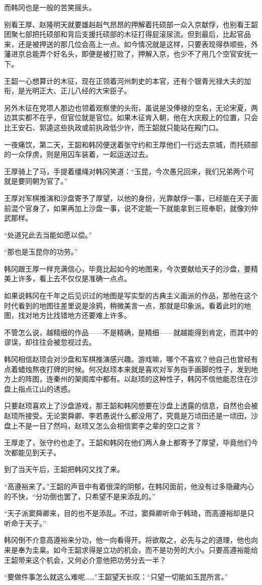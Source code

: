 而韩冈也是一般的苦笑摇头。

别看王厚、赵隆明天就要雄赳赳气昂昂的押解着托硕部一众入京献俘，也别看王韶团聚七部把托硕部和背后支援托硕部的木征打得屁滚尿流。但到最后，比起官品来，还是被押送的那几位会高上一点。如今情况就是这样，只要表现得恭顺些，外藩进京总能弄个好名头，即便是被打败了，押解入京，也少不了用几个空官安抚一下。

王韶一心想算计的木征，现在正领着河州刺史的本官，还有个银青光禄大夫的加衔，是光明正大、正儿八经的大宋臣子。

另外木征在党项人那边也领着观察使的头衔，虽说是没俸禄的空名，无论宋夏，两边其实都不在乎，但官位就是官位。如果木征肯入朝，他在大庆殿上的位置，只会比王安石、郭逵这些执政或前执政低少许，而王韶就只能站在殿门口。

一夜痛饮，第二天，王韶和韩冈便送着张守约和王厚他们一行远去京城，而托硕部的一众俘虏，则是用囚车装着，一起运送过去。

王厚骑上了马，手提着缰绳对韩冈笑道：“玉昆，今次愚兄回来，我们兄弟两个可就是要同朝为官了。”

王厚对军棋推演和沙盘寄予了厚望，以他的身份，光靠献俘一事，已经能在天子面前混个官身了，如果再加上沙盘一事，说不定能一下就能拿到三班奉职，就像刘仲武那样。

“处道兄此去当能如愿以偿。”

“那也是玉昆你的功劳。”

韩冈跟王厚一样充满信心，毕竟比起如今的地图来，今次要献给天子的沙盘，要精美上许多，看上去不仅仅是准确一点点。

如果说韩冈在千年之后见识过的地图是写实型的古典主义画派的作品，那他在这个时代看到的地图往差里说是涂鸦，稍微美言一点，那就是印象派。看着此时的地图，找对地方比找错地方还要难上许多。

不管怎么说，越精细的作品——不是精确，是精细——就越能得到肯定，而其中的谬误，却往往会被忽视过去。

韩冈相信赵顼会对沙盘和军棋推演感兴趣。游戏嘛，哪个不喜欢？他自己也曾经有点着蜡烛熬夜打牌的时候。何况赵顼本来就是喜欢对军务指手画脚的性子，发到地方上的阵图，连秦州的架阁库中都有。以赵顼的这种性子，韩冈不信他能忍住在沙盘上指点江山的诱惑。

只要赵顼喜欢上了沙盘游戏，那王韶和韩冈想要在沙盘上透露的信息，自然也会被赵顼所接受。无论窦舜卿、李若愚说什么都没用了，究竟是万顷田还是一顷田，沙盘上不是一目了然吗，赵顼又怎么会相信窦李之辈的空口之言？

王厚走了，张守约也走了。王韶和韩冈在他们两人身上都寄予了厚望，毕竟他们今次都能见到天子。

到了当天午后，王韶把韩冈又找了来。

“高遵裕来了。”王韶的声音中有着很深的阴郁，在韩冈面前，他没有过多隐藏内心的不快，“分功倒也罢了，只希望不是来添乱的。”

“天子派窦舜卿来，目的也不是添乱。不过，窦舜卿听命于韩琦，而高遵裕却是只听命于天子。”

韩冈倒不介意高遵裕来分功，他一向看得开。将欲取之，必先与之的道理，他也向来是奉为圭臬。如今王韶求得是立功的机会，而不是功劳的大小。只要高遵裕能给王韶带来这个机会，又何必介意他把功劳分去一半？

“要做件事怎么就这么难呢……”王韶望天长叹：“只望一切能如玉昆所言。”

